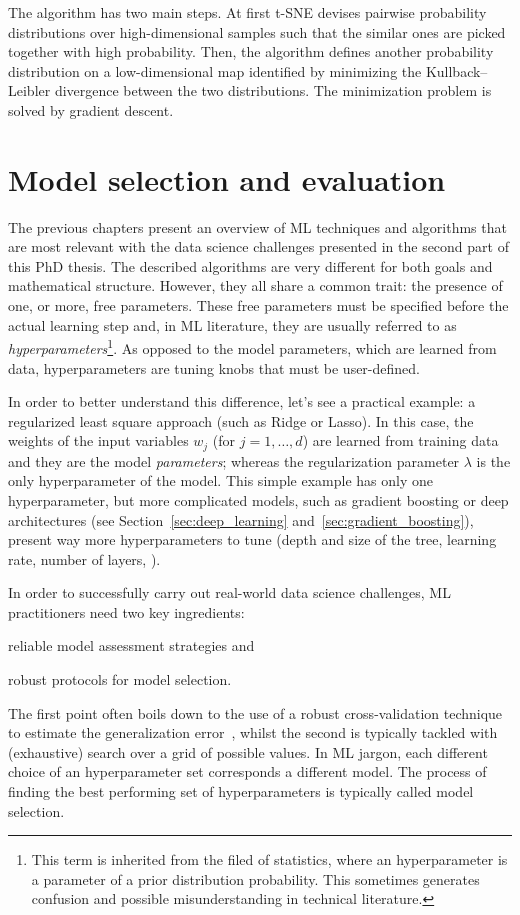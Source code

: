 	The algorithm has two main steps. At first t-SNE devises pairwise probability distributions over high-dimensional samples such that the similar ones are picked together with high probability. Then, the algorithm defines another probability distribution on a low-dimensional map identified by minimizing the Kullback–Leibler divergence between the two distributions. The minimization problem is solved by gradient descent. %
    

  \section{Model selection and evaluation} \label{subsec:model_selection}
  
  The previous chapters present an overview of ML techniques and algorithms that are most relevant with the data science challenges presented in the second part of this PhD thesis.
  The described algorithms are very different for both goals and mathematical structure.
  However, they all share a common trait: the presence of one, or more, free parameters.
  These free parameters must be specified before the actual learning step and, in ML literature, they are usually referred to as \textit{hyperparameters}\footnote{ This term is inherited from the filed of statistics, where an hyperparameter is a parameter of a prior distribution probability. This sometimes generates confusion and possible misunderstanding in technical literature.}.
  As opposed to the model parameters, which are learned from data, hyperparameters are tuning knobs that must be user-defined.
  
  In order to better understand this difference, let's see a practical example: a regularized least square approach (such as Ridge or Lasso).
  In this case, the weights of the input variables $w_j$ (for $j=1,\dots,d$) are learned from training data and they are the model \textit{parameters}; whereas the regularization parameter $\lambda$ is the only hyperparameter of the model.
  This simple example has only one hyperparameter, but more complicated models, such as gradient boosting or deep architectures (see Section~\ref{sec:deep_learning} and~\ref{sec:gradient_boosting}), present way more hyperparameters to tune (\eg depth and size of the tree, learning rate, number of layers, \etc).
  
  In order to successfully carry out real-world data science challenges, ML practitioners need two key ingredients:
  \begin{enumerate*}[label=(\roman*)]
  	\item reliable model assessment strategies and %
  	\item robust protocols for model selection.
  \end{enumerate*}
  The first point often boils down to the use of a robust cross-validation technique to estimate the generalization error~\cite{molinaro2005prediction}, whilst the second is typically tackled with (exhaustive) search over a grid of possible values. 
  In ML jargon, each different choice of an hyperparameter set corresponds a different model. The process of finding the best performing set of hyperparameters is typically called model selection.

